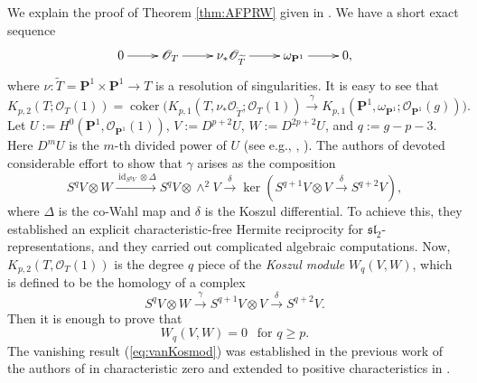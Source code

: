 \documentclass[graybox]{svmult}
\newcommand{\sO}{\mathscr{O}}
\def\nP{\mathbf{P}}
\def\id{\operatorname{id}}
\def\coker{\operatorname{coker}}
\begin{document}
We explain the proof of Theorem \ref{thm:AFPRW} given in \cite{AFPRW}. We have a short exact sequence
$$
\xymatrix{
0 \ar[r] & \sO_T \ar[r] & \nu_* \sO_{\widetilde{T}} \ar[r] & \omega_{\nP^1} \ar[r] & 0,
}
$$
where $\nu \colon \widetilde{T} = \nP^1 \times \nP^1 \to T$ is a resolution of singularities. It is easy to see that 
$$
K_{p,2}(T; \sO_T(1)) = \coker\big(K_{p,1}(T, \nu_* \sO_{\widetilde{T}}; \sO_T(1)) \xrightarrow{~\gamma~} K_{p,1}(\nP^1, \omega_{\nP^1}; \sO_{\nP^1}(g)) \big).
$$
Let $U:=H^0(\nP^1, \sO_{\nP^1}(1))$, $V:=D^{p+2} U$, $W:=D^{2p+2} U$, and $q:=g-p-3$. Here $D^m U$ is the $m$-th divided power of $U$ (see e.g., \cite[Section 3]{AFPRW}, \cite[Section 2]{Park2}). The authors of \cite{AFPRW} devoted considerable effort to show that $\gamma$ arises as the composition
\begin{equation}\label{eq:gammaintro}
S^{q} V \otimes W \xrightarrow{\id_{S^{q}V} \otimes \Delta}  S^{q} V \otimes \wedge^2 V \xrightarrow{~\delta~}  \ker(S^{q+1}V \otimes V \xrightarrow{~\delta~} S^{q+2}V),
\end{equation}
where $\Delta$ is the co-Wahl map and $\delta$ is the Koszul differential. To achieve this, they established an explicit characteristic-free Hermite reciprocity for $\mathfrak{sl}_2$-representations, and they carried out complicated algebraic computations. Now, $K_{p,2}(T, \sO_T(1))$ is the degree $q$ piece of the \emph{Koszul module} $W_q(V, W)$, which is defined to be the homology of a complex
$$
S^q V \otimes W \xrightarrow{~\gamma~} S^{q+1}V \otimes V \xrightarrow{~\delta~} S^{q+2} V.
$$
Then it is enough to prove that 
\begin{equation}\label{eq:vanKosmod}
W_q(V, W) = 0~~\text{ for $q \geq p$}.
\end{equation}
The vanishing result (\ref{eq:vanKosmod}) was established in the previous work of the authors of \cite{AFPRW} in characteristic zero and extended to positive characteristics in \cite{AFPRW}.
\end{document}
